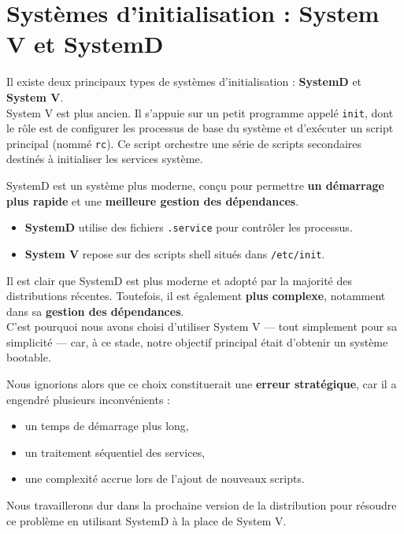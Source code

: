 \section{Systèmes d'initialisation : System V et SystemD}
\label{sssec:sysv}

Il existe deux principaux types de systèmes d'initialisation : \textbf{SystemD} et \textbf{System V}. \\
System V est plus ancien. Il s'appuie sur un petit programme appelé \texttt{init}, dont le rôle est de configurer les processus de base du système et d'exécuter un script principal (nommé \texttt{rc}). Ce script orchestre une série de scripts secondaires destinés à initialiser les services système.

SystemD est un système plus moderne, conçu pour permettre \textbf{un démarrage plus rapide} et une \textbf{meilleure gestion des dépendances}.

\begin{itemize}
    \item \textbf{SystemD} utilise des fichiers \texttt{.service} pour contrôler les processus.
    \item \textbf{System V} repose sur des scripts shell situés dans \texttt{/etc/init}.
\end{itemize}

\bigbreak
Il est clair que SystemD est plus moderne et adopté par la majorité des distributions récentes. Toutefois, il est également \textbf{plus complexe}, notamment dans sa \textbf{gestion des dépendances}. \\
C’est pourquoi nous avons choisi d’utiliser System V — tout simplement pour sa simplicité — car, à ce stade, notre objectif principal était d’obtenir un système bootable.

Nous ignorions alors que ce choix constituerait une \textbf{erreur stratégique}, car il a engendré plusieurs inconvénients :
\begin{itemize}
    \item un temps de démarrage plus long,
    \item un traitement séquentiel des services,
    \item une complexité accrue lors de l’ajout de nouveaux scripts.
\end{itemize}

Nous travaillerons dur dans la prochaine version de la distribution pour résoudre ce problème en utilisant SystemD à la place de System V.

    

